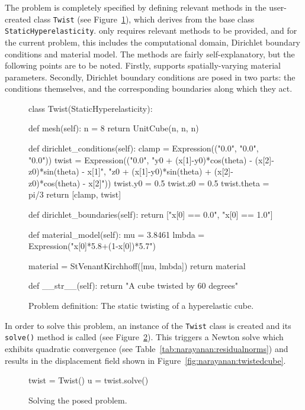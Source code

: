 \noindent The problem is completely specified by defining relevant
methods in the user-created class {\tt Twist} (see
Figure~\ref{code:narayanan:statictwist}), which derives from the base
class {\tt StaticHyperelasticity}. \twist{} only requires relevant
methods to be provided, and for the current problem, this includes the
computational domain, Dirichlet boundary conditions and material
model. The methods are fairly self-explanatory, but the following
points are to be noted. Firstly, \twist{} supports spatially-varying
material parameters. Secondly, Dirichlet boundary conditions are posed
in two parts: the conditions themselves, and the corresponding
boundaries along which they act.

\begin{figure}[ht]
\begin{python}
class Twist(StaticHyperelasticity):

    def mesh(self):
        n = 8
        return UnitCube(n, n, n)

    def dirichlet_conditions(self):
        clamp = Expression(("0.0", "0.0", "0.0"))
        twist = Expression(("0.0",
        "y0 + (x[1]-y0)*cos(theta) - (x[2]-z0)*sin(theta) - x[1]",
        "z0 + (x[1]-y0)*sin(theta) + (x[2]-z0)*cos(theta) - x[2]"))
        twist.y0 = 0.5
        twist.z0 = 0.5
        twist.theta = pi/3
        return [clamp, twist]

    def dirichlet_boundaries(self):
        return ["x[0] == 0.0", "x[0] == 1.0"]

    def material_model(self):
        mu    = 3.8461
        lmbda = Expression("x[0]*5.8+(1-x[0])*5.7")

        material = StVenantKirchhoff([mu, lmbda])
        return material

    def __str__(self):
        return "A cube twisted by 60 degrees"
\end{python}
\caption{Problem definition: The static twisting of a hyperelastic
  cube.}
\label{code:narayanan:statictwist}
\end{figure}

In order to solve this problem, an instance of the {\tt Twist} class
is created and its {\tt solve()} method is called (see
Figure~\ref{code:narayanan:solveproblem}). This triggers a Newton
solve which exhibits quadratic convergence (see
Table~\ref{tab:narayanan:residualnorms}) and results in the
displacement field shown in
Figure~\ref{fig:narayanan:twistedcube}.

\begin{figure}[ht]
\begin{python}
twist = Twist()
u = twist.solve()
\end{python}
\caption{Solving the posed problem.}
\label{code:narayanan:solveproblem}
\end{figure}


